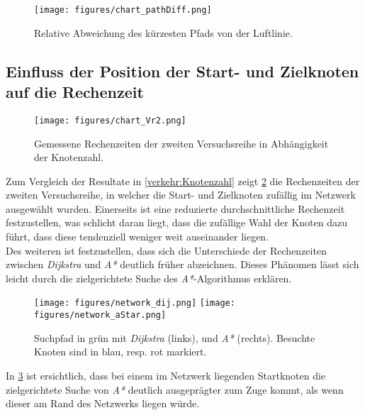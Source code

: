 \begin{figure}
\centering
\texttt{[image: figures/chart\_pathDiff.png]}

\caption{Relative Abweichung des kürzesten Pfads von der Luftlinie.}
\label{verkehr:pathDifference}
\end{figure}


\subsection{Einfluss der Position der Start- und Zielknoten auf die Rechenzeit}

\begin{figure}
\centering
\texttt{[image: figures/chart\_Vr2.png]}\\
\caption{Gemessene Rechenzeiten der zweiten Versuchsreihe in Abhängigkeit der Knotenzahl.}
\label{verkehr:Vr2}
\end{figure}

Zum Vergleich der Resultate in \ref{verkehr:Knotenzahl} zeigt \ref{verkehr:Vr2} die Rechenzeiten der zweiten Versuchsreihe, in welcher die Start- und Zielknoten zufällig im Netzwerk ausgewählt wurden. Einerseits ist eine reduzierte durchschnittliche Rechenzeit festzustellen, was schlicht daran liegt, dass die zufällige Wahl der Knoten dazu führt, dass diese tendenziell weniger weit auseinander liegen.\\
Des weiteren ist festzustellen, dass sich die Unterschiede der Rechenzeiten zwischen  \emph{Dijkstra} und \emph{A*} deutlich früher abzeichnen. Dieses Phänomen lässt sich leicht durch die zielgerichtete Suche des \emph{A*}-Algorithmus erklären.

\begin{figure}
\centering
\texttt{[image: figures/network\_dij.png]}\qquad
\texttt{[image: figures/network\_aStar.png]}
\caption{Suchpfad in grün mit \emph{Dijkstra} (links), und \emph{A*} (rechts). Besuchte Knoten sind in blau, resp. rot markiert.}
\label{verkehr:Comparison}
\end{figure}

In \ref{verkehr:Comparison} ist ersichtlich, dass bei einem im Netzwerk liegenden Startknoten die zielgerichtete Suche von \emph{A*} deutlich ausgeprägter zum Zuge kommt, als wenn dieser am Rand des Netzwerks liegen würde.
